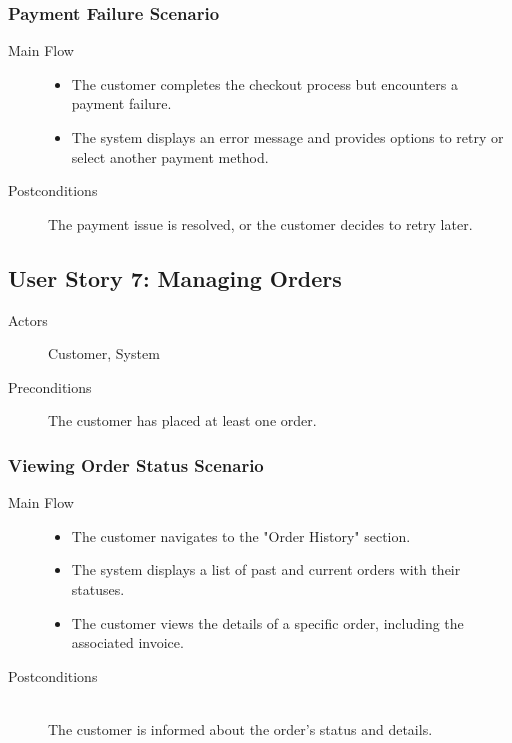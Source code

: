 \documentclass[a4paper,journal]{IEEEtran}
\begin{document}
\subsubsection{Payment Failure Scenario}
\begin{description}
  \item[Main Flow] \hfill
    \begin{itemize}
      \item The customer completes the checkout process but encounters a payment
        failure.
      \item The system displays an error message and provides options to retry
        or select another payment method.
    \end{itemize}
  \item[Postconditions]
    The payment issue is resolved, or the customer decides to retry later.
\end{description}
\subsection{User Story 7: Managing Orders}
\begin{description}
  \item[Actors] Customer, System
  \item[Preconditions] \hfill
    The customer has placed at least one order.
\end{description}
\subsubsection{Viewing Order Status Scenario}
\begin{description}
  \item[Main Flow] \hfill
    \begin{itemize}
      \item The customer navigates to the "Order History" section.
      \item The system displays a list of past and current orders with their
        statuses.
      \item The customer views the details of a specific order, including the
        associated invoice.
    \end{itemize}
  \item[Postconditions] \hfill \\
    The customer is informed about the order's status and details.
\end{description}
\end{document}
